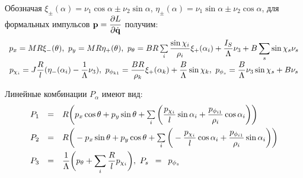 Обозначая $\xi_\pm(\alpha) = \nu_1\cos\alpha \pm \nu_2\sin\alpha$, $\eta_\pm(\alpha) = \nu_1\sin\alpha \pm \nu_2\cos\alpha$, для формальных импульсов $\boldsymbol{\mathbf{p}} = \displaystyle\frac{\displaystyle \partial L}{\displaystyle \partial \dot{\boldsymbol{\mathbf{q}}}}$ получим:
\begin{equation}\label{p}
    \begin{array}{c}
        p_x  =  MR\xi_-(\theta), \ p_y = MR\eta_+(\theta),\ 
        p_\theta  =  BR\sum\limits_i\ddfrac{\sin\chi_i}{\rho_i}\xi_+(\alpha_i) + \ddfrac{I_S}{\Lambda}\nu_3 + B\sum\limits_s\sin\chi_s\nu_s\vsp
        p_{\chi_i}  =  J\ddfrac{R}{l}(\eta_-(\alpha_i) - \ddfrac{1}{\Lambda}\nu_3), \ p_{\phi_{k1}}  =  \ddfrac{BR}{\rho_k}\xi_+(\alpha_k)+\ddfrac{B}{\Lambda}\sin\chi_k,\ %
        p_{\phi_s}  =  \ddfrac{B}{\Lambda}\nu_3\sin\chi_s + B\nu_s
    \end{array}
\end{equation}

Линейные комбинации $P_\alpha$ имеют вид:
\begin{equation}\label{bigP}
    \begin{array}{rcl}
        P_1 & = & R\bigg(p_x\cos\theta + p_y\sin\theta + \sum\limits_{i}\bigg(\ddfrac{p_{\chi_i}}{l}\sin\alpha_i +  \ddfrac{p_{\phi_{i1}}}{\rho_i}\cos\alpha_i\bigg)\bigg)\vsp
        P_2 & = & R\bigg(-p_x\sin\theta + p_y\cos\theta + \sum\limits_{i}\bigg(-\ddfrac{p_{\chi_i}}{l}\cos\alpha_i +  \ddfrac{p_{\phi_{i1}}}{\rho_i}\sin\alpha_i\bigg)\bigg)\vsp
        P_3 & = & \ddfrac{1}{\Lambda}\bigg(p_\theta + \sum\limits_{i}\ddfrac{R}{l}p_{\chi_i}\bigg),\ 
        P_s \enspace = \enspace p_{\phi_s}
    \end{array}
\end{equation}

